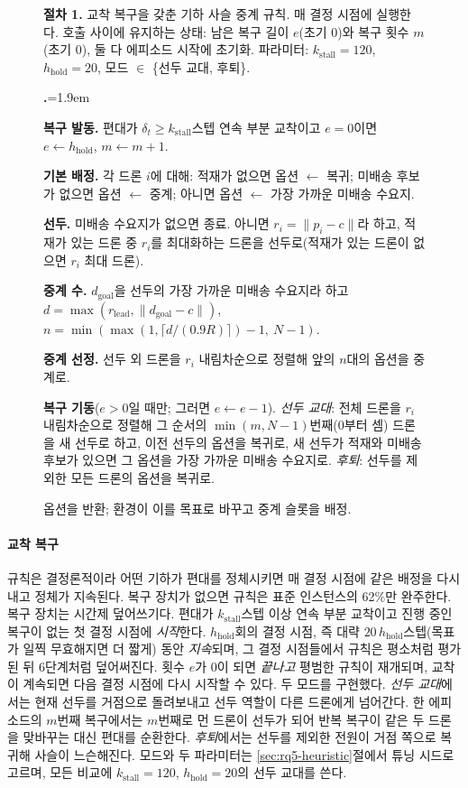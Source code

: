 \documentclass[final,5p,times,twocolumn]{elsarticle}
\newcounter{procstep}
\newenvironment{procsteps}{\setcounter{procstep}{0}\begin{list}{\stepcounter{procstep}\textbf{\theprocstep.}}{\leftmargin=1.9em\itemsep=1.5pt\parsep=0pt\topsep=3pt}}{\end{list}}
\begin{document}
\begin{figure}[t]
\footnotesize
\noindent\textbf{절차 1.} 교착 복구을 갖춘 기하 사슬 중계 규칙. 매 결정 시점에 실행한다.
호출 사이에 유지하는 상태: 남은 복구 길이 $e$(초기 0)와 복구 횟수 $m$(초기 0), 둘 다 에피소드
시작에 초기화. 파라미터: $k_{\mathrm{stall}} = 120$, $h_{\mathrm{hold}} = 20$, 모드 $\in$
\{선두 교대, 후퇴\}.
\begin{procsteps}
\item \textbf{복구 발동.} 편대가 $\delta_t \ge k_{\mathrm{stall}}$스텝 연속 부분 교착이고 $e = 0$이면
$e \leftarrow h_{\mathrm{hold}}$, $m \leftarrow m + 1$.
\item \textbf{기본 배정.} 각 드론 $i$에 대해: 적재가 없으면 옵션 $\leftarrow$ 복귀; 미배송 후보가
없으면 옵션 $\leftarrow$ 중계; 아니면 옵션 $\leftarrow$ 가장 가까운 미배송 수요지.
\item \textbf{선두.} 미배송 수요지가 없으면 종료. 아니면 $r_i = \|p_i - c\|$라 하고, 적재가 있는
드론 중 $r_i$를 최대화하는 드론을 선두로(적재가 있는 드론이 없으면 $r_i$ 최대 드론).
\item \textbf{중계 수.} $d_{\mathrm{goal}}$을 선두의 가장 가까운 미배송 수요지라 하고
$d = \max(r_{\mathrm{lead}}, \|d_{\mathrm{goal}} - c\|)$,
$n = \min(\max(1, \lceil d / (0.9R) \rceil) - 1,\ N - 1)$.
\item \textbf{중계 선정.} 선두 외 드론을 $r_i$ 내림차순으로 정렬해 앞의 $n$대의 옵션을 중계로.
\item \textbf{복구 기동}($e > 0$일 때만; 그러면 $e \leftarrow e - 1$). \emph{선두 교대}: 전체
드론을 $r_i$ 내림차순으로 정렬해 그 순서의 $\min(m, N-1)$번째(0부터 셈) 드론을 새 선두로 하고,
이전 선두의 옵션을 복귀로, 새 선두가 적재와 미배송 후보가 있으면 그 옵션을 가장 가까운 미배송
수요지로. \emph{후퇴}: 선두를 제외한 모든 드론의 옵션을 복귀로.
\item 옵션을 반환; 환경이 이를 목표로 바꾸고 중계 슬롯을 배정.
\end{procsteps}
\end{figure}

\paragraph{교착 복구}
규칙은 결정론적이라 어떤 기하가 편대를 정체시키면 매 결정 시점에 같은 배정을 다시 내고 정체가
지속된다. 복구 장치가 없으면 규칙은 표준 인스턴스의 62\%만 완주한다. 복구 장치는 시간제 덮어쓰기다.
편대가 $k_{\mathrm{stall}}$스텝 이상 연속 부분 교착이고 진행 중인 복구이 없는 첫 결정 시점에
\emph{시작}한다. $h_{\mathrm{hold}}$회의 결정 시점, 즉 대략 $20\,h_{\mathrm{hold}}$스텝(목표가
일찍 무효해지면 더 짧게) 동안 \emph{지속}되며, 그 결정 시점들에서 규칙은 평소처럼 평가된 뒤 6단계처럼
덮어써진다. 횟수 $e$가 0이 되면 \emph{끝나고} 평범한 규칙이 재개되며, 교착이 계속되면 다음 결정
시점에 다시 시작할 수 있다. 두 모드를 구현했다. \emph{선두 교대}에서는 현재 선두를 거점으로
돌려보내고 선두 역할이 다른 드론에게 넘어간다. 한 에피소드의 $m$번째 복구에서는 $m$번째로 먼 드론이
선두가 되어 반복 복구이 같은 두 드론을 맞바꾸는 대신 편대를 순환한다. \emph{후퇴}에서는 선두를
제외한 전원이 거점 쪽으로 복귀해 사슬이 느슨해진다. 모드와 두 파라미터는 \ref{sec:rq5-heuristic}절에서
튜닝 시드로 고르며, 모든 비교에 $k_{\mathrm{stall}} = 120$, $h_{\mathrm{hold}} = 20$의 선두 교대를
쓴다.
\end{document}
